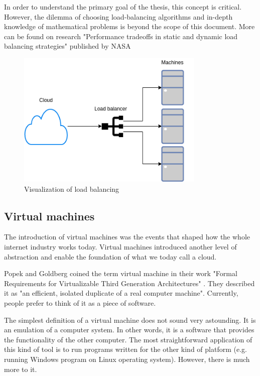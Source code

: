 In order to understand the primary goal of the thesis, this concept is critical. However, the dilemma of choosing load-balancing algorithms and in-depth knowledge of mathematical problems is beyond the scope of this document. More can be found on research "Performance tradeoffs in static and dynamic load balancing strategies" published by NASA \cite{load-balancing}

\begin{figure}[h!]
 \centering
  \includegraphics[width=0.8\textwidth]{pictures/loadbalancing.png}
  \caption{Visualization of load balancing }
  \label{fig:load-balancing}
\end{figure}


\subsection{Virtual machines}
\label{subsec:vm}

The introduction of virtual machines was the events that shaped how the whole internet industry works today. Virtual machines introduced another level of abstraction and enable the foundation of what we today call a cloud. 

Popek and Goldberg coined the term virtual machine in their work "Formal Requirements for Virtualizable Third Generation Architectures" \cite{VM}. They described it as "an efficient, isolated duplicate of a real computer machine". Currently, people prefer to think of it as a piece of software. 

The simplest definition of a virtual machine does not sound very astounding. It is an emulation of a computer system. In other words, it is a software that provides the functionality of the other computer. The most straightforward application of this kind of tool is to run programs written for the other kind of platform (e.g. running Windows program on Linux operating system). However, there is much more to it.

